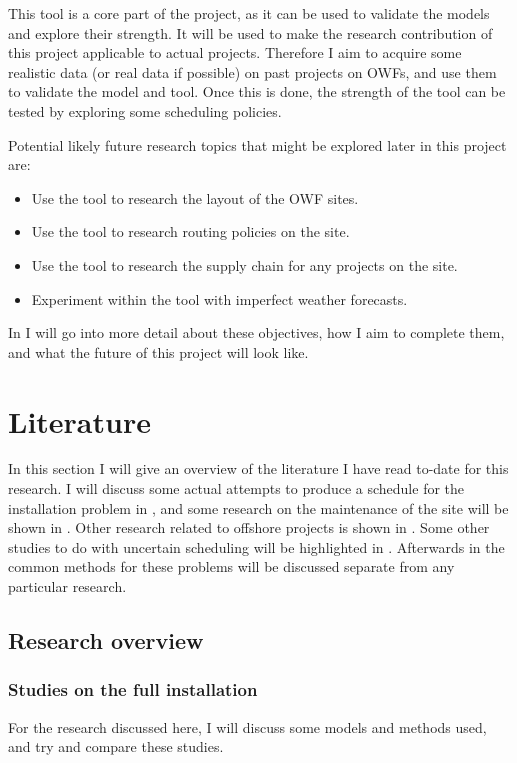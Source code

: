 \documentclass[a4paper,12pt]{article}
\begin{document}
This tool is a core part of the project, as it can be used to validate the models and explore their strength. It will be used to make the research contribution of this project applicable to actual projects. Therefore I aim to acquire some realistic data (or real data if possible) on past projects on OWFs, and use them to validate the model and tool. Once this is done, the strength of the tool can be tested by exploring some scheduling policies. 

\bigskip

Potential likely future research topics that might be explored later in this project are:

\begin{itemize}
\item Use the tool to research the layout of the OWF sites.
\item Use the tool to research routing policies on the site.
\item Use the tool to research the supply chain for any projects on the site. 
\item Experiment within the tool with imperfect weather forecasts. 
\end{itemize}

In  I will go into more detail about these objectives, how I aim to complete them, and what the future of this project will look like.

\pagebreak

\section{Literature} \label{s:lit}
In this section I will give an overview of the literature I have read to-date for this research. I will discuss some actual attempts to produce a schedule for the installation problem in , and some research on the maintenance of the site will be shown in . Other research related to offshore projects is shown in . Some other studies to do with uncertain scheduling will be highlighted in .  Afterwards in  the common methods for these problems will be discussed separate from any particular research. 

\subsection{Research overview} \label{ss:rese}

\subsubsection{Studies on the full installation} \label{sss:sched}
For the research discussed here, I will discuss some models and methods used, and try and compare these studies. 
\end{document}
